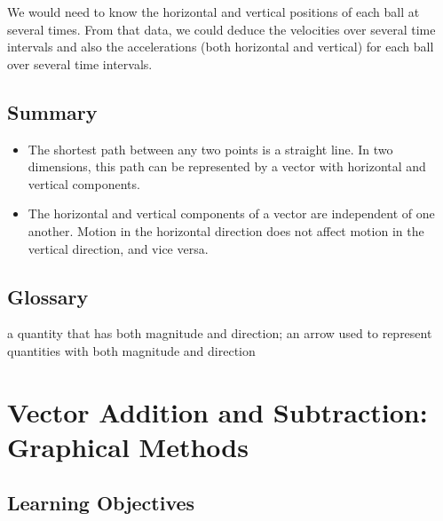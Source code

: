 \documentclass[
]{book}
\providecommand{\tightlist}{%
  \setlength{\itemsep}{0pt}\setlength{\parskip}{0pt}}
\begin{document}
\leavevmode{}%
We would need to know the horizontal and vertical positions of each ball
at several times. From that data, we could deduce the velocities over
several time intervals and also the accelerations (both horizontal and
vertical) for each ball over several time intervals.

\hypertarget{fs-id1165298944131-summary}{}
\hypertarget{summary}{%
\subsection{Summary}\label{summary}}

\begin{itemize}
\tightlist
\item
  \protect\hypertarget{import-auto-id1165296313373}{}{The shortest path between any two points is a straight line. In two
  dimensions, this path can be represented by a vector with horizontal
  and vertical components.}
\item
  \protect\hypertarget{import-auto-id1165296414067}{}{The horizontal and vertical components of a vector are independent
  of one another. Motion in the horizontal direction does not affect
  motion in the vertical direction, and vice
  versa.}
\end{itemize}

\hypertarget{glossary-6}{%
\subsection{Glossary}\label{glossary-6}}

\begin{description}
\tightlist
\item[vector]
a quantity that has both magnitude and direction; an arrow used to
represent quantities with both magnitude and direction
\end{description}

\hypertarget{vector-addition-and-subtraction-graphical-methods}{%
\section{Vector Addition and Subtraction: Graphical Methods}\label{vector-addition-and-subtraction-graphical-methods}}

\hypertarget{fs-id2265665}{}
\hypertarget{learning-objectives-8}{%
\subsection{Learning Objectives}\label{learning-objectives-8}}
\end{document}
